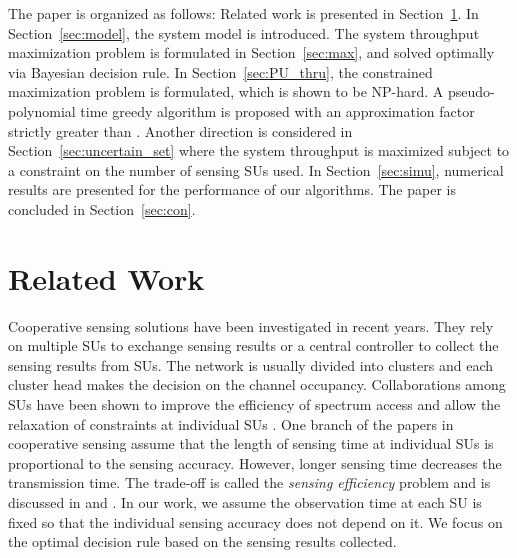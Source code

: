 \documentclass[conference]{IEEEtran}
\begin{document}
The paper is organized as follows: Related work is presented in Section~\ref{sec:related}. In Section~\ref{sec:model}, the system model is introduced. The system throughput maximization problem is formulated in Section~\ref{sec:max}, and solved optimally via Bayesian decision rule. In Section~\ref{sec:PU_thru}, the constrained maximization problem is formulated, which is shown to be NP-hard. A pseudo-polynomial time greedy algorithm is proposed with an approximation factor strictly greater than . Another direction is considered in Section~\ref{sec:uncertain_set} where the system throughput is maximized subject to a constraint on the number
of sensing SUs used. In Section~\ref{sec:simu}, numerical results are presented for the performance of our algorithms. The paper is concluded in Section~\ref{sec:con}.  

\section{Related Work}
\label{sec:related}
Cooperative sensing solutions have been investigated in recent years. They rely on multiple SUs to exchange sensing results or a central controller to collect the sensing results from SUs. The network is usually divided into clusters and each cluster head makes the decision on the channel occupancy. Collaborations among SUs have been shown to improve the efficiency of spectrum access and allow the relaxation of constraints at individual SUs \cite{5054703}\cite{1542650}. One branch of the papers in cooperative sensing assume that the length of sensing time at individual SUs is proportional to the sensing accuracy. However, longer sensing time decreases the transmission time. The trade-off is called the \emph{sensing efficiency} problem and is discussed in \cite{Lee_2008} and \cite{Min}. In our work, we assume the observation time at each SU is fixed so that the individual sensing accuracy does not depend on it. We focus on the optimal decision rule based on the sensing results collected. 
\end{document}
